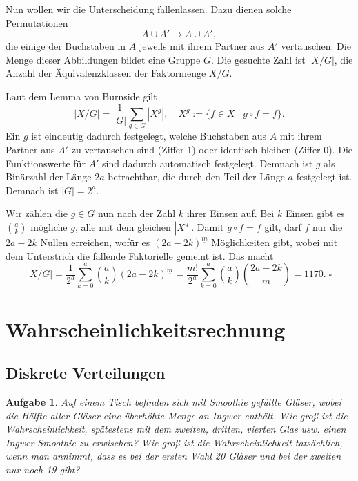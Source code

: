 \documentclass[a4paper,10pt,fleqn,twoside]{scrartcl}
\numberwithin{equation}{section}
\renewcommand{\qedsymbol}{\ensuremath{\square}}
\theoremstyle{Aufgabe}
\newtheorem{Aufgabe}{\sffamily Aufgabe}[section]
\begin{document}
Nun wollen wir die Unterscheidung fallenlassen. Dazu dienen
solche Permutationen
\[A\cup A'\to A\cup A',\]
die einige der Buchstaben in $A$ jeweils mit ihrem Partner aus $A'$
vertauschen. Die Menge dieser Abbildungen bildet eine Gruppe $G$.
Die gesuchte Zahl ist $|X/G|$, die Anzahl der Äquivalenzklassen der
Faktormenge $X/G$.

Laut dem Lemma von Burnside gilt
\begin{equation}
|X/G| = \frac{1}{|G|}\sum_{g\in G} |X^g|,\quad X^g := \{f\in X\mid g\circ f=f\}.
\end{equation}
Ein $g$ ist eindeutig dadurch festgelegt, welche Buchstaben aus $A$
mit ihrem Partner aus $A'$ zu vertauschen sind (Ziffer 1) oder
identisch bleiben (Ziffer 0). Die Funktionswerte für $A'$ sind dadurch
automatisch festgelegt. Demnach ist $g$ als Binärzahl der Länge $2a$
betrachtbar, die durch den Teil der Länge $a$ festgelegt ist.
Demnach ist $|G|=2^a$.

Wir zählen die $g\in G$ nun nach der Zahl $k$ ihrer Einsen auf. Bei
$k$ Einsen gibt es $\binom{a}{k}$ mögliche $g$, alle mit dem
gleichen $|X^g|$. Damit $g\circ f=f$ gilt, darf $f$ nur die $2a-2k$
Nullen erreichen, wofür es $(2a-2k)^{\underline m}$ Möglichkeiten
gibt, wobei mit dem Unterstrich die fallende Faktorielle gemeint ist.
Das macht
\begin{equation}
|X/G| = \frac{1}{2^a}\sum_{k=0}^a \binom{a}{k}(2a-2k)^{\underline m}
= \frac{m!}{2^a}\sum_{k=0}^a \binom{a}{k}\binom{2a-2k}{m}
= 1170.\;\qedsymbol
\end{equation}

\newpage
\section{Wahrscheinlichkeitsrechnung}
\subsection{Diskrete Verteilungen}
\begin{Aufgabe}
Auf einem Tisch befinden sich mit Smoothie gefüllte Gläser, wobei
die Hälfte aller Gläser eine überhöhte Menge an Ingwer enthält.
Wie groß ist die Wahrscheinlichkeit, spätestens mit dem zweiten,
dritten, vierten Glas usw. einen Ingwer-Smoothie zu erwischen?
Wie groß ist die Wahrscheinlichkeit tatsächlich, wenn man annimmt,
dass es bei der ersten Wahl 20 Gläser und bei der zweiten nur noch
19 gibt?
\end{Aufgabe}
\end{document}
